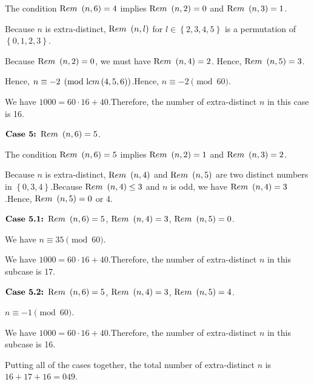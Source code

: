 \begin{enumerate}
{{ The condition ${\textrm Rem} \ \left( n, 6 \right) = 4$ implies ${\textrm Rem} \ \left( n, 2 \right) = 0$ and ${\textrm Rem} \ \left( n, 3 \right) = 1$.

 Because $n$ is extra-distinct, ${\textrm Rem} \ \left( n, l \right)$ for $l \in \left\{ 2, 3, 4 , 5 \right\}$ is a permutation of $\left\{ 0, 1 ,2 , 3 \right\}$.

 Because ${\textrm Rem} \ \left( n, 2 \right) = 0$, we must have ${\textrm Rem} \ \left( n, 4 \right) = 2$. Hence, ${\textrm Rem} \ \left( n, 5 \right) = 3$.

 Hence, $n \equiv -2 \pmod{{\textrm lcm} \left( 4, 5 , 6 \right)}$.Hence, $n \equiv - 2 \pmod{60}$.

 We have $1000 = 60 \cdot 16 + 40$.Therefore, the number of extra-distinct $n$ in this case is 16.

 $\textbf{Case 5:  } {\textrm Rem} \ \left( n, 6 \right) = 5$.

 The condition ${\textrm Rem} \ \left( n, 6 \right) = 5$ implies ${\textrm Rem} \ \left( n, 2 \right) = 1$ and ${\textrm Rem} \ \left( n, 3 \right) = 2$.

 Because $n$ is extra-distinct, ${\textrm Rem} \ \left( n, 4 \right)$ and ${\textrm Rem} \ \left( n, 5 \right)$ are two distinct numbers in $\left\{ 0, 3, 4 \right\}$.Because ${\textrm Rem} \ \left( n, 4 \right) \leq 3$ and $n$ is odd, we have ${\textrm Rem} \ \left( n, 4 \right) = 3$.Hence, ${\textrm Rem} \ \left( n, 5 \right) = 0$ or 4.

 $\textbf{Case 5.1:  } {\textrm Rem} \ \left( n, 6 \right) = 5$, ${\textrm Rem} \ \left( n, 4 \right) = 3$, ${\textrm Rem} \ \left( n, 5 \right) = 0$.

 We have $n \equiv 35 \pmod{60}$.

 We have $1000 = 60 \cdot 16 + 40$.Therefore, the number of extra-distinct $n$ in this subcase is 17.

 $\textbf{Case 5.2:  } {\textrm Rem} \ \left( n, 6 \right) = 5$, ${\textrm Rem} \ \left( n, 4 \right) = 3$, ${\textrm Rem} \ \left( n, 5 \right) = 4$.

 $n \equiv - 1 \pmod{60}$.

 We have $1000 = 60 \cdot 16 + 40$.Therefore, the number of extra-distinct $n$ in this subcase is 16.

 Putting all of the cases together, the total number of extra-distinct $n$ is $16 + 17 + 16 = \boxed{049}$.

 



}}
\end{enumerate}
